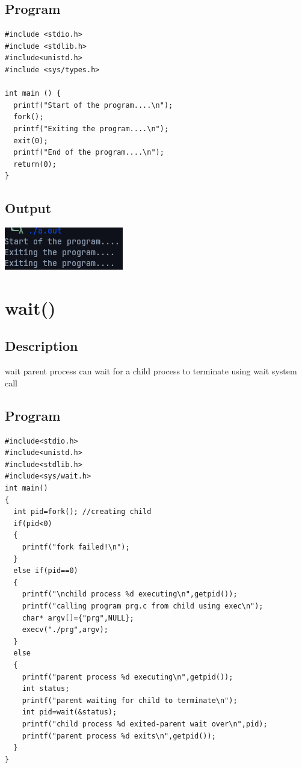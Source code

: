 \subsection{Program}
\begin{lstlisting}[label={list:c_program:exit}]
#include <stdio.h>
#include <stdlib.h>
#include<unistd.h>
#include <sys/types.h>

int main () {
  printf("Start of the program....\n");
  fork();
  printf("Exiting the program....\n");
  exit(0);
  printf("End of the program....\n");
  return(0);
}

\end{lstlisting}

\subsection{Output}
\includegraphics[]{Cycle_1//Outputs/exit.png}

\section{wait()}
\subsection{Description}
wait parent process can wait for a child process to terminate using wait system
call
\subsection{Program}
\begin{lstlisting}[label={list:c_program:exit}]
#include<stdio.h>
#include<unistd.h>
#include<stdlib.h>
#include<sys/wait.h>
int main()
{
  int pid=fork(); //creating child
  if(pid<0)
  {
    printf("fork failed!\n");
  }
  else if(pid==0)
  {
    printf("\nchild process %d executing\n",getpid());
    printf("calling program prg.c from child using exec\n");
    char* argv[]={"prg",NULL};
    execv("./prg",argv);
  }
  else
  {
    printf("parent process %d executing\n",getpid());
    int status;
    printf("parent waiting for child to terminate\n");
    int pid=wait(&status);
    printf("child process %d exited-parent wait over\n",pid);
    printf("parent process %d exits\n",getpid());
  }
}

\end{lstlisting}


